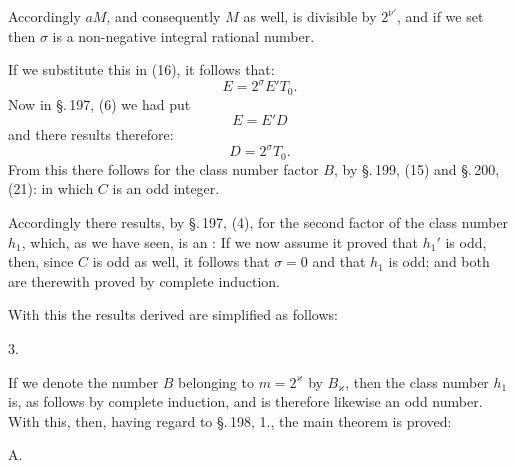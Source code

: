 Accordingly $aM$, and consequently $M$ as well, is divisible by $2^{\nu'}$,
and if we set
then $\sigma$ is a non-negative integral rational number.

If we substitute this in (16), it follows that:
\[ E = 2^\sigma E' T_0. \]
Now in \S.\,197, (6) we had put
\[ E = E' D \]
and there results therefore:
\[ D = 2^\sigma T_0. \]
From this there follows for the class number factor $B$, by \S.\,199, (15)
and \S.\,200, (21):
in which $C$ is an odd integer.

Accordingly there results, by \S.\,197, (4), for the second factor
of the class number $h_1$, which, as we have seen, is an
:
If we now assume it proved that $h_1'$ is odd, then, since
$C$ is odd as well, it follows that $\sigma = 0$ and that $h_1$
is odd; and both are therewith proved by complete
induction.

With this the results derived are simplified as
follows:

3. 

If we denote the number $B$ belonging to $m = 2^\varkappa$ by
$B_\varkappa$, then the class number $h_1$ is, as follows by
complete induction,
and is therefore likewise an odd number. With this, then, having
regard to \S.\,198, 1., the main theorem is proved:

A. 
